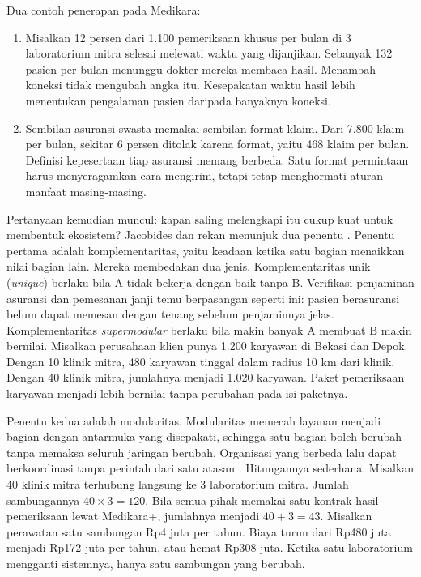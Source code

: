 Dua contoh penerapan pada Medikara:
\begin{enumerate}
  \item Misalkan 12 persen dari 1.100 pemeriksaan khusus per bulan di 3 laboratorium mitra selesai
        melewati waktu yang dijanjikan. Sebanyak 132 pasien per bulan menunggu dokter mereka membaca
        hasil. Menambah koneksi tidak mengubah angka itu. Kesepakatan waktu hasil lebih menentukan
        pengalaman pasien daripada banyaknya koneksi.
  \item Sembilan asuransi swasta memakai sembilan format klaim. Dari 7.800 klaim per bulan, sekitar
        6 persen ditolak karena format, yaitu 468 klaim per bulan. Definisi kepesertaan tiap
        asuransi memang berbeda. Satu format permintaan harus menyeragamkan cara mengirim, tetapi
        tetap menghormati aturan manfaat masing-masing.
\end{enumerate}

Pertanyaan kemudian muncul: kapan saling melengkapi itu cukup kuat untuk membentuk ekosistem?
Jacobides dan rekan menunjuk dua penentu \cite{jacobides2018ecosystems}. Penentu pertama adalah komplementaritas, yaitu keadaan ketika satu bagian menaikkan nilai bagian
lain. Mereka membedakan dua jenis. Komplementaritas unik (\textit{unique}) berlaku bila A tidak
bekerja dengan baik tanpa B. Verifikasi penjaminan asuransi dan pemesanan janji temu berpasangan
seperti ini: pasien berasuransi belum dapat memesan dengan tenang sebelum penjaminnya jelas.
Komplementaritas \textit{supermodular} berlaku bila makin banyak A membuat B makin bernilai.
Misalkan perusahaan klien punya 1.200 karyawan di Bekasi dan Depok. Dengan 10 klinik mitra, 480
karyawan tinggal dalam radius 10 km dari klinik. Dengan 40 klinik mitra, jumlahnya menjadi 1.020
karyawan. Paket pemeriksaan karyawan menjadi lebih bernilai tanpa perubahan pada isi paketnya.

Penentu kedua adalah modularitas. Modularitas memecah layanan menjadi bagian dengan antarmuka yang
disepakati, sehingga satu bagian boleh berubah tanpa memaksa seluruh jaringan berubah. Organisasi
yang berbeda lalu dapat berkoordinasi tanpa perintah dari satu atasan
\cite{jacobides2018ecosystems}. Hitungannya sederhana. Misalkan 40 klinik mitra terhubung langsung
ke 3 laboratorium mitra. Jumlah sambungannya $40 \times 3 = 120$. Bila semua pihak memakai satu
kontrak hasil pemeriksaan lewat Medikara+, jumlahnya menjadi $40 + 3 = 43$. Misalkan perawatan satu
sambungan Rp4 juta per tahun. Biaya turun dari Rp480 juta menjadi Rp172 juta per tahun, atau hemat
Rp308 juta. Ketika satu laboratorium mengganti sistemnya, hanya satu sambungan yang berubah.

